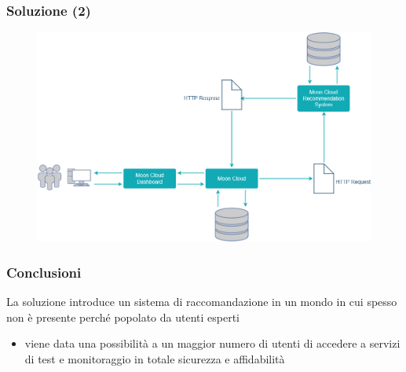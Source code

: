\begin{frame}
    \frametitle{Soluzione (2)}
    \begin{figure}
        \centering
        \includegraphics[scale=0.42]{images/UML_MoonCloud_HowToDo}
    \end{figure}
\end{frame}

\begin{frame}
    \frametitle{Conclusioni}
    La soluzione introduce un sistema di raccomandazione in un mondo in cui spesso non è presente perché 
    popolato da utenti esperti
    \begin{itemize}
        \item viene data una possibilità a un \alert{maggior numero di utenti} di accedere a servizi di test e 
        monitoraggio in totale sicurezza e affidabilità
    \end{itemize}
\end{frame}


